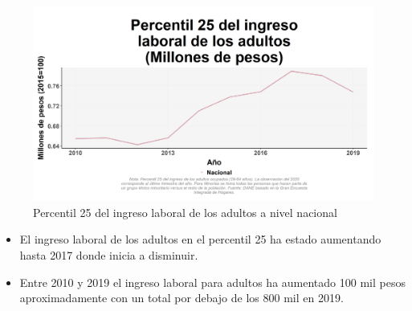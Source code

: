     \begin{figure}[H]
        \caption{Percentil 25 del ingreso laboral de los adultos a nivel nacional \label{map_result_2} }
        \begin{center}
        \includegraphics[width=\textwidth,keepaspectratio]{img/var_10_trend.png}
        \end{center}
    \end{figure}
            \begin{itemize}
                \item El ingreso laboral de los adultos en el percentil 25 ha estado aumentando hasta 2017 donde inicia a disminuir.
                \item Entre 2010 y 2019 el ingreso laboral para adultos ha aumentado 100 mil pesos aproximadamente con un total por debajo de los 800 mil en 2019.
                \end{itemize}

